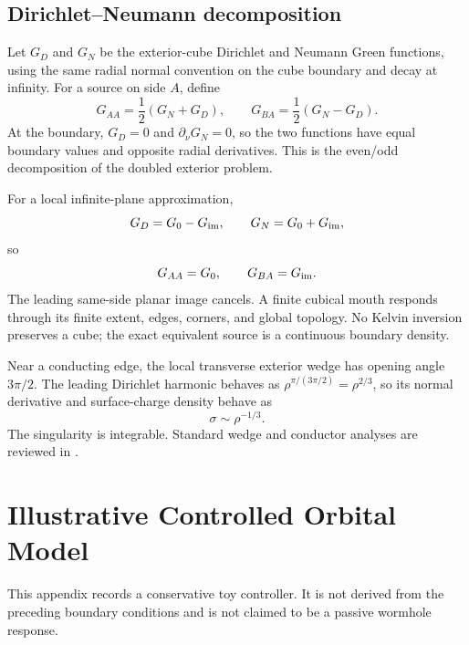 \documentclass[journal,a4paper]{IEEEtran}
\begin{document}
\subsection{Dirichlet--Neumann decomposition}

Let \(G_D\) and \(G_N\) be the exterior-cube Dirichlet and Neumann Green functions, using the same radial normal convention on the cube boundary and decay at infinity. For a source on side \(A\), define
\begin{equation}
    \boxed{
    G_{AA}=\frac{1}{2}(G_N+G_D),
    \qquad
    G_{BA}=\frac{1}{2}(G_N-G_D).
    }
    \label{eq:DN_decomposition}
\end{equation}
At the boundary, \(G_D=0\) and \(\partial_\nu G_N=0\), so the two functions have equal boundary values and opposite radial derivatives. This is the even/odd decomposition of the doubled exterior problem.

For a local infinite-plane approximation,
\begin{equation}
    G_D=G_0-G_{\rm im},
    \qquad
    G_N=G_0+G_{\rm im},
\end{equation}
so
\begin{equation}
    G_{AA}=G_0,
    \qquad
    G_{BA}=G_{\rm im}.
\end{equation}
The leading same-side planar image cancels. A finite cubical mouth responds through its finite extent, edges, corners, and global topology. No Kelvin inversion preserves a cube; the exact equivalent source is a continuous boundary density.

Near a conducting edge, the local transverse exterior wedge has opening angle \(3\pi/2\). The leading Dirichlet harmonic behaves as \(\rho^{\pi/(3\pi/2)}=\rho^{2/3}\), so its normal derivative and surface-charge density behave as
\begin{equation}
    \sigma\sim\rho^{-1/3}.
\end{equation}
The singularity is integrable. Standard wedge and conductor analyses are reviewed in \cite{Jackson1999,Smythe1989}.

\section{Illustrative Controlled Orbital Model}
\label{app:orbital}

This appendix records a conservative toy controller. It is not derived from the preceding boundary conditions and is not claimed to be a passive wormhole response.
\end{document}
